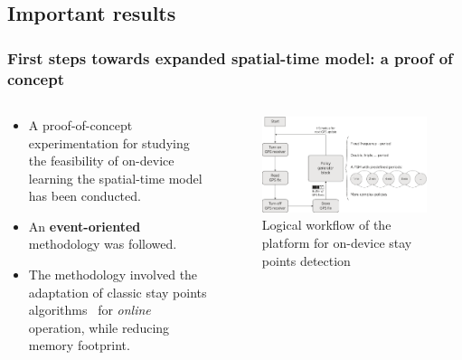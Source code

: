 \documentclass[compress,9pt,xcolor={dvipsnames,table}]{beamer}
\begin{document}
\subsection{Important results}
\label{sub:important_results}
\begin{frame}[t]\frametitle{First steps towards expanded spatial-time model: a proof of concept}
\small
\begin{columns}
  \begin{column}{5cm}
    \begin{itemize}
    \item A proof-of-concept experimentation for studying the feasibility of on-device learning the spatial-time model has been conducted.
    \item An \textbf{event-oriented} methodology was followed.
    \item The methodology involved the adaptation of classic stay points algorithms~\cite{Montoliu2010,Zheng2011} for \emph{online} operation, while reducing memory footprint.
  \end{itemize}
  \end{column}
  \begin{column}{7cm}
  \begin{figure}[tb]
  \scriptsize
  \centering
  \includegraphics[width=\columnwidth]{../../../resources/images/vectors/policy-creator-methodology}
  \caption{Logical workflow of the platform for on-device stay points detection}
  \label{fig:logical-workflow}
\end{figure}
  \end{column}
\end{columns}
\end{frame}
\end{document}
